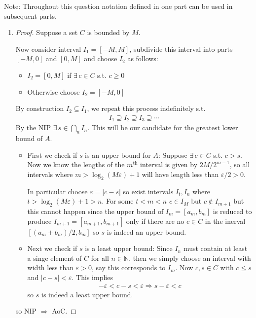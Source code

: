  Note: Throughout this question notation defined in one part can be used in 
 subsequent parts.
 \begin{enumerate}[label=(\alph*)]
    \item 
    \begin{proof}
        Suppose a set $C$ is bounded by $M$. 
    
        Now consider interval $I_1 = [-M, M]$, subdivide this interval into 
        parts $[-M,0]$ and $[0, M]$ and choose $I_2$ as follows:
        \begin{itemize}
            \item $I_2 = [0,M]$ if $\exists \, c\in C$ s.t. $c \geq 0$
            \item Otherwise choose $I_2 = [-M,0]$
        \end{itemize}
        By construction $I_2 \subseteq I_1$, we repeat this process 
        indefinitely s.t. 
        \begin{align*}
            I_1 \supseteq I_2 \supseteq I_3 \supseteq \cdots
        \end{align*}
        By the NIP $\exists \, s \in \bigcap_n I_n$. This will be our 
        candidate for the greatest lower bound of $A$.

        \begin{itemize}
            \item First we check if $s$ is an upper bound for $A$:
                Suppose $\exists \, c \in C$ s.t. $c > s$. Now we know the 
                lengths of the $m^{\text{th}}$ interval is given by $2M / 2^{m-1}$,
                so all intervals where $m > \log_2(M \varepsilon)+1$ will have length 
                less than $\varepsilon/2 > 0$.

                In particular choose $\varepsilon = |c-s|$ so exist intervals $I_t, I_n$ where $t > \log_2(M \varepsilon)+1 > n$.
                For some $t < m < n$ $c \in I_M$ but $c \not\in I_{m+1}$
                but this cannot happen since the upper bound of $I_{m} = [a_{m},b_m]$ is reduced
                to produce $I_{m+1}=[a_{m+1}, b_{m+1}]$ 
                only if there are no $c\in C$ in the inerval $[(a_{m}+b_m)/2, b_m]$ so $s$ is indeed
                an upper bound.

                \item Next we check if $s$ is a least upper bound: 
                Since $I_n$ must contain at least a singe element of $C$ for all $n \in \mathbb{N}$, then
                we simply choose an interval with width less than $\varepsilon > 0$, say this corresponds to
                $I_m$. Now $c, s \in C$ with $c \leq s$ and $|c-s| < \varepsilon$.
                This implies
                \begin{align*}
                    -\varepsilon < c - s < \varepsilon \Rightarrow s - \varepsilon < c
                \end{align*} 
                so $s$ is indeed a least upper bound.
            \end{itemize}
            so NIP $ \Rightarrow $ AoC.
    \end{proof}


\end{enumerate}
